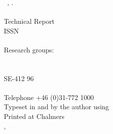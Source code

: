 


\quad \vfill

\noindent
\textbf{\lictitle}\\
\textsc{\licauthor}\\
\\
\textcopyright\ \licauthor, \licyear.\\
\\
Technical Report \lictechreportno\\
ISSN \licissn\\
\\
Research groups: \licresearchgroup\\
\licdepartment\\
\textsc{\licuniversity}\\
SE-412 96 \liccity \\
\liccountry\\
Telephone +46 (0)31-772 1000\\

\noindent
Typeset in \mainfontfamily{} and \monofontfamily{} by the author using \XeTeX\\
Printed at Chalmers \\ %
\liccity, \liccountry ~\licyear
